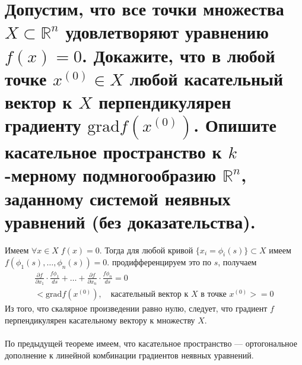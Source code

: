 \documentclass{article}
\begin{document}
\section{Допустим, что все точки множества $X \subset \mathbb{R}^n$ удовлетворяют уравнению $f(x)=0$. Докажите, что в любой точке $x^{(0)}\in X$ любой касательный вектор к $X$ перпендикулярен градиенту $\mathrm{grad}f(x^{(0)})$. Опишите касательное пространство к $k$-мерному подмногообразию $\mathbb{R}^n$, заданному системой неявных уравнений (без доказательства).}
Имеем $\forall x \in X \; f(x) = 0$. Тогда для любой кривой $\{x_i=\phi_i(s)\} \subset X$ имеем $f(\phi_1(s),\dotsc,\phi_n(s))=0$. продифференцируем это по $s$, получаем
\begin{gather*}
    \frac{\partial f}{\partial x_1} \cdot \frac{f\phi_1}{ds}+\dotsc + \frac{\partial f}{\partial x_n} \cdot \frac{f\phi_n}{ds} = 0\\
    <\mathrm{grad}f(x^{(0)}),\quad \text{касательный вектор к $X$ в точке $x^{(0)}$}>=0
\end{gather*}
Из того, что скалярное произведении равно нулю, следует, что градиент $f$ перпендикулярен касательному вектору к множеству $X$.\\\\
По предыдущей теореме имеем, что касательное пространство --- ортогональное дополнение к линейной комбинации градиентов неявных уравнений.
\end{document}
